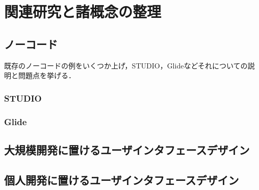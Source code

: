 \chapter{関連研究と諸概念の整理}
\label{chap:prevresearch}

\section{ノーコード}
既存のノーコードの例をいくつか上げ，STUDIO，Glideなどそれについての説明と問題点を挙げる．

\subsection{STUDIO}

\subsection{Glide}


\section{大規模開発に置けるユーザインタフェースデザイン}
\section{個人開発に置けるユーザインタフェースデザイン}
%
%
%

